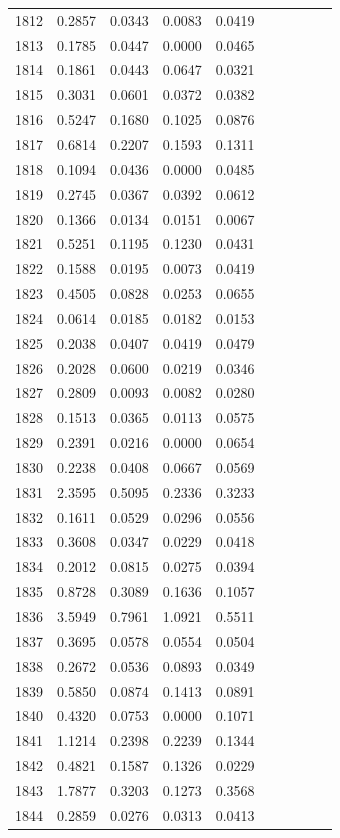 \begin{table}
\begin{tabular}{cccccccccc}
1812& 0.2857& 0.0343& 0.0083& 0.0419\\ 
1813& 0.1785& 0.0447& 0.0000& 0.0465\\ 
1814& 0.1861& 0.0443& 0.0647& 0.0321\\ 
1815& 0.3031& 0.0601& 0.0372& 0.0382\\ 
1816& 0.5247& 0.1680& 0.1025& 0.0876\\ 
1817& 0.6814& 0.2207& 0.1593& 0.1311\\ 
1818& 0.1094& 0.0436& 0.0000& 0.0485\\ 
1819& 0.2745& 0.0367& 0.0392& 0.0612\\ 
1820& 0.1366& 0.0134& 0.0151& 0.0067\\ 
1821& 0.5251& 0.1195& 0.1230& 0.0431\\ 
1822& 0.1588& 0.0195& 0.0073& 0.0419\\ 
1823& 0.4505& 0.0828& 0.0253& 0.0655\\ 
1824& 0.0614& 0.0185& 0.0182& 0.0153\\ 
1825& 0.2038& 0.0407& 0.0419& 0.0479\\ 
1826& 0.2028& 0.0600& 0.0219& 0.0346\\ 
1827& 0.2809& 0.0093& 0.0082& 0.0280\\ 
1828& 0.1513& 0.0365& 0.0113& 0.0575\\ 
1829& 0.2391& 0.0216& 0.0000& 0.0654\\ 
1830& 0.2238& 0.0408& 0.0667& 0.0569\\ 
1831& 2.3595& 0.5095& 0.2336& 0.3233\\ 
1832& 0.1611& 0.0529& 0.0296& 0.0556\\ 
1833& 0.3608& 0.0347& 0.0229& 0.0418\\ 
1834& 0.2012& 0.0815& 0.0275& 0.0394\\ 
1835& 0.8728& 0.3089& 0.1636& 0.1057\\ 
1836& 3.5949& 0.7961& 1.0921& 0.5511\\ 
1837& 0.3695& 0.0578& 0.0554& 0.0504\\ 
1838& 0.2672& 0.0536& 0.0893& 0.0349\\ 
1839& 0.5850& 0.0874& 0.1413& 0.0891\\ 
1840& 0.4320& 0.0753& 0.0000& 0.1071\\ 
1841& 1.1214& 0.2398& 0.2239& 0.1344\\ 
1842& 0.4821& 0.1587& 0.1326& 0.0229\\ 
1843& 1.7877& 0.3203& 0.1273& 0.3568\\ 
1844& 0.2859& 0.0276& 0.0313& 0.0413\\ 

\end{tabular}
\end{table}
